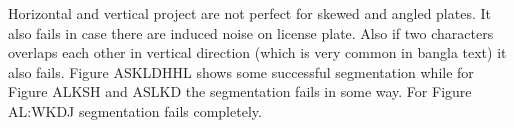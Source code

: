 Horizontal and vertical project are not perfect for skewed and angled plates. It also fails in case there are induced noise on license plate. Also if two characters overlaps each other in vertical direction (which is very common in bangla text) it also fails. Figure ASKLDHHL shows some successful segmentation while for Figure ALKSH and ASLKD the segmentation fails in some way. For Figure AL:WKDJ segmentation fails completely.